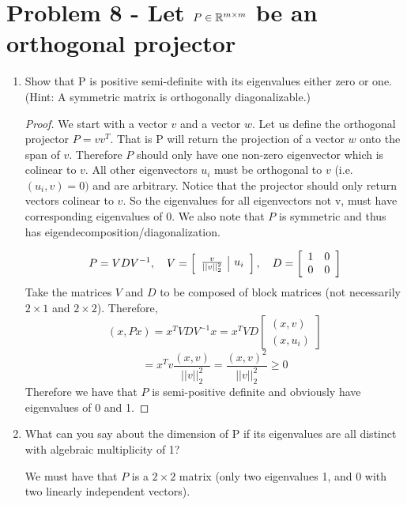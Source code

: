 \documentclass{article}
\begin{document}
\section{Problem 8 - Let $P \in \mathbb{R}^{m\times m}$ be an orthogonal projector}
\begin{enumerate}

\item Show that P is positive semi-definite with its eigenvalues either zero or one. (Hint: A symmetric matrix is orthogonally diagonalizable.)

\begin{proof}

We start with a vector $v$ and a vector $w$. Let us define the orthogonal projector $P = vv^T$. That is P will return the projection of a vector $w$ onto the span of $v$. Therefore $P$ should only have one non-zero eigenvector which is colinear to $v$. All other eigenvectors $u_i$ must be orthogonal to $v$ (i.e. $(u_i, v) = 0)$ and are arbitrary. Notice that the projector should only return vectors colinear to $v$. So the eigenvalues for all eigenvectors not v, must have corresponding eigenvalues of 0. We also note that $P$ is symmetric and thus has eigendecomposition/diagonalization. 

\[
    P = VDV^{-1}, \quad V = \left[\begin{array}{c | c} \frac{v}{||v||_2^2} & u_i \end{array}\right], \quad D = \left[\begin{array}{c c}1 & 0 \\ 0 & 0\end{array}\right]
\]
Take the matrices $V$ and $D$ to be composed of block matrices (not necessarily $2\times 1$ and $2\times 2$). 
Therefore, 
\[
    (x, Px) = x^T VDV^{-1}x = x^T V D \left[\begin{array}{c} (x, v) \\ \hline (x, u_i) \end{array}\right]
\]
\[
     = x^T v \frac{(x, v)}{||v||_2^2} = \frac{(x, v)^2}{||v||_2^2} \ge 0 
\]
Therefore we have that $P$ is semi-positive definite and obviously have eigenvalues of 0 and 1. 
\end{proof}

\item What can you say about the dimension of P if its eigenvalues are all distinct with algebraic multiplicity of 1?

We must have that $P$ is a $2\times 2$ matrix (only two eigenvalues 1, and 0 with two linearly independent vectors). 


\end{enumerate}
\end{document}
